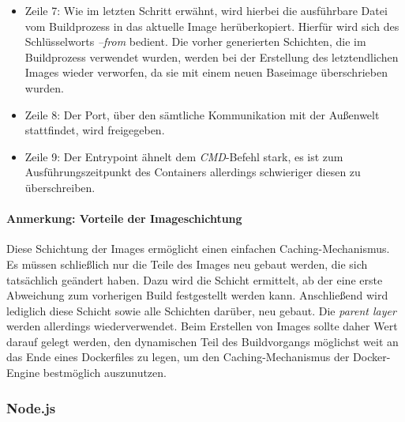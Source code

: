 \begin{itemize}
  \item Zeile 7: Wie im letzten Schritt erwähnt, wird hierbei die ausführbare Datei vom Buildprozess in das aktuelle Image herüberkopiert. Hierfür wird sich des Schlüsselworts \emph{--from} bedient. Die vorher generierten Schichten, die im Buildprozess verwendet wurden, werden bei der Erstellung des letztendlichen Images wieder verworfen, da sie mit einem neuen Baseimage überschrieben wurden.

  \item Zeile 8: Der Port, über den sämtliche Kommunikation mit der Außenwelt stattfindet, wird freigegeben. 

  \item Zeile 9: Der Entrypoint ähnelt dem \emph{CMD}-Befehl stark, es ist zum Ausführungszeitpunkt des Containers allerdings schwieriger diesen zu überschreiben.

\end{itemize}


\paragraph{Anmerkung: Vorteile der Imageschichtung} Diese Schichtung der Images ermöglicht einen einfachen Caching-Mechanismus. Es müssen schließlich nur die Teile des Images neu gebaut werden, die sich tatsächlich geändert haben. Dazu wird die Schicht ermittelt, ab der eine erste Abweichung zum vorherigen Build festgestellt werden kann. Anschließend wird lediglich diese Schicht sowie alle Schichten darüber, neu gebaut. Die \emph{parent layer} werden allerdings wiederverwendet. Beim Erstellen von Images sollte daher Wert darauf gelegt werden, den dynamischen Teil des Buildvorgangs möglichst weit an das Ende eines Dockerfiles zu legen, um den Caching-Mechanismus der Docker-Engine bestmöglich auszunutzen.

\subsubsection{Node.js}

